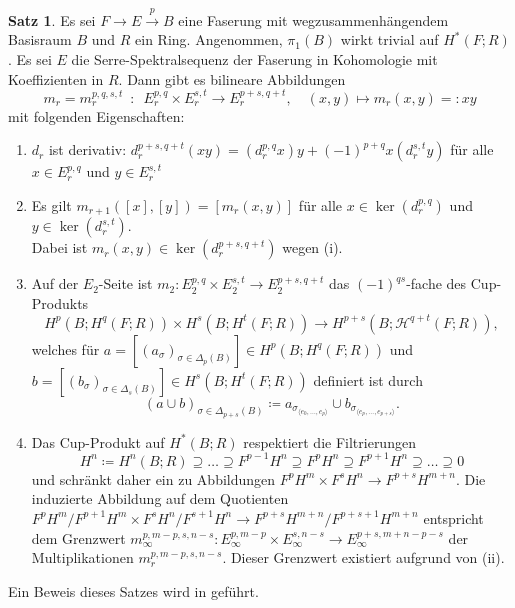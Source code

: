 \documentclass[11pt, a4paper, german]{article}
\theoremstyle{definition}
\newtheorem{satz}[lem]{Satz}
\theoremstyle{remark}
\newcommand{\angles}[1]{{\langle #1 \rangle}}
\newcommand{\LH}{\mathcal{H}} %
\begin{document}
\begin{satz}
  Es sei $F \to E \xrightarrow{p} B$ eine Faserung mit wegzusammenhängendem Basisraum $B$ und $R$ ein Ring.
  Angenommen, $\pi_1(B)$ wirkt trivial auf $H^*(F; R)$.
  Es sei $E$ die Serre-Spektralsequenz der Faserung in Kohomologie mit Koeffizienten in $R$.
  Dann gibt es bilineare Abbildungen
  \[
    m_r = m_r^{p,q,s,t} \enspace:\enspace E^{p,q}_r \times E^{s,t}_r \to E^{p+s,q+t}_r, \quad
    (x, y) \mapsto m_r(x, y) =: xy
  \]
  mit folgenden Eigenschaften:
  \begin{enumerate}[label=(\roman*)]
    \item $d_r$ ist derivativ: $d_r^{p+s,q+t}(xy) = (d_r^{p,q} x) y + (-1)^{p+q} x (d_r^{s,t} y)$ für alle $x \in E^{p,q}_r$ und $y \in E^{s,t}_r$
    \item Es gilt $m_{r+1}([x], [y]) = [m_r(x, y)]$ für alle $x \in \ker(d_r^{p,q})$ und $y \in \ker(d_r^{s,t})$. \\
    Dabei ist $m_r(x, y) \in \ker(d_r^{p+s,q+t})$ wegen (i).
    \item Auf der $E_2$-Seite ist $m_2 : E_2^{p,q} \!\times\! E_2^{s,t} \!\to\! E_2^{p+s,q+t}$ das $(-1)^{qs}$-fache des Cup-Produkts
    \[
      H^p(B; H^q(F; R)) \times H^s(B; H^t(F; R)) \to H^{p+s}(B; \LH^{q+t}(F; R)),
    \]
    welches für $a = [(a_\sigma)_{\sigma \in \Delta_p(B)}] \in H^p(B; H^q(F; R))$ und $b = [(b_\sigma)_{\sigma \in \Delta_s(B)}] \in H^s(B; H^t(F; R))$ definiert ist durch
    \[
      (a \cup b)_{\sigma \in \Delta_{p+s}(B)} \coloneqq
      a_{\sigma_{\angles{e_0, \ldots, e_p}}} \cup b_{\sigma_{\angles{e_p, \ldots, e_{p+s}}}}.
    \]
    \item Das Cup-Produkt auf $H^*(B; R)$ respektiert die Filtrierungen
    \[ H^n \coloneqq H^n(B; R) \supseteq \ldots \supseteq F^{p-1} H^n \supseteq F^p H^n \supseteq F^{p+1} H^n \supseteq \ldots \supseteq 0 \]
    und schränkt daher ein zu Abbildungen $F^p H^m \times F^s H^n \to F^{p+s} H^{m+n}$.
    Die induzierte Abbildung auf dem Quotienten $F^p H^m/F^{p+1} H^m \times F^s H^n/F^{s+1} H^n \to F^{p+s} H^{m+n} / F^{p+s+1} H^{m+n}$ entspricht dem Grenzwert $m_\infty^{p,m-p,s,n-s} : E_\infty^{p,m-p} \times E_\infty^{s,n-s} \to E_\infty^{p+s,m+n-p-s}$ der Multiplikationen $m_r^{p,m-p,s,n-s}$.
    Dieser Grenzwert existiert aufgrund von (ii).
  \end{enumerate}
\end{satz}

Ein Beweis dieses Satzes wird in \cite[Abschnitt 5.3]{mccleary:ss} geführt.
\end{document}

